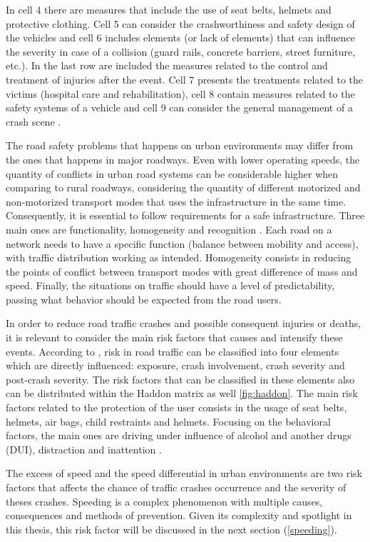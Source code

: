 In cell 4 there are measures that include the use of seat belts, helmets and protective clothing. Cell 5 can consider the crashworthiness and safety design of the vehicles and cell 6 includes elements (or lack of elements) that can influence the severity in case of a collision (guard rails, concrete barriers, street furniture, etc.). In the last row are included the measures related to the control and treatment of injuries after the event. Cell 7 presents the treatments related to the victims (hospital care and rehabilitation), cell 8 contain measures related to the safety systems of a vehicle and cell 9 can consider the general management of a crash scene \cite{Mohan2016}. 

The road safety problems that happens on urban environments may differ from the ones that happens in major roadways. Even with lower operating speeds, the quantity of conflicts in urban road systems can be considerable higher when comparing to rural roadways, considering the quantity of different motorized and non-motorized transport modes that uses the infrastructure in the same time. Consequently, it is essential to follow requirements for a safe infrastructure. Three main ones are functionality, homogeneity and recognition \cite{SWOV2003}. Each road on a network needs to have a specific function (balance between mobility and access), with traffic distribution working as intended. Homogeneity consists in reducing the points of conflict between transport modes with great difference of mass and speed. Finally, the situations on traffic should have a level of predictability, passing what behavior should be expected from the road users.

In order to reduce road traffic crashes and possible consequent injuries or deaths, it is relevant to consider the main risk factors that causes and intensify these events. According to \textcite{WHO2004}, risk in road traffic can be classified into four elements which are directly influenced: exposure, crash involvement, crash severity and post-crash severity. The risk factors that can be classified in these elements also can be distributed within the Haddon matrix as well \autoref{fig:haddon}. The main risk factors related to the protection of the user consists in the usage of seat belts, helmets, air bags, child restraints and helmets. Focusing on the behavioral factors, the main ones are driving under influence of alcohol and another drugs (DUI), distraction and inattention \cite{Shinar2017}.

The excess of speed and the speed differential in urban environments are two risk factors that affects the chance of traffic crashes occurrence and the severity of theses crashes. Speeding is a complex phenomenon with multiple causes, consequences and methods of prevention. Given its complexity and spotlight in this thesis, this risk factor will be discussed in the next section (\ref{speeding}). 

